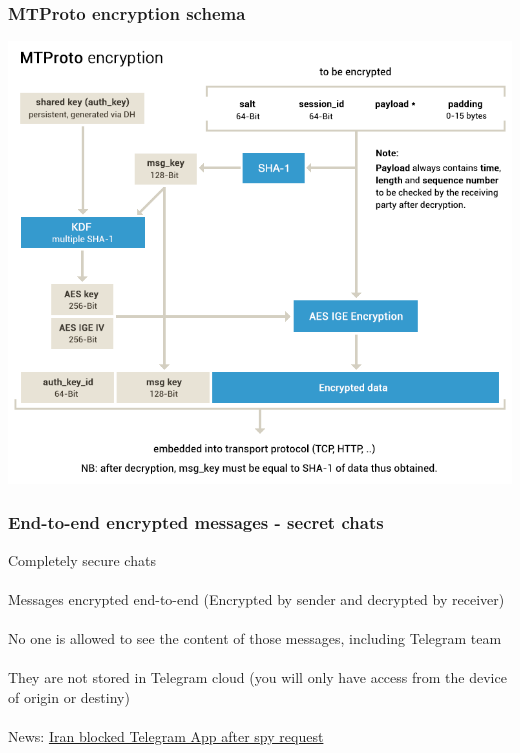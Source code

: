\documentclass{beamer}
\begin{document}
\begin{frame}
\frametitle{MTProto encryption schema}
\begin{center}
\includegraphics[scale=0.25]{images/mtproto_schema}
\end{center}
\end{frame}
\begin{frame}
\frametitle{End-to-end encrypted messages - secret chats}
Completely secure chats \\~\\
Messages encrypted end-to-end (Encrypted by sender and decrypted by receiver) \\~\\
No one is allowed to see the content of those messages, including Telegram team \\~\\
They are not stored in Telegram cloud (you will only have access from the device
of origin or destiny) \\~\\
News: \href{http://abcnews.go.com/Technology/wireStory/telegram-ceo-app-blocked-iran-surveillance-request-34644937}{\color{blue}Iran blocked Telegram App after spy request}
\end{frame}
\end{document}
